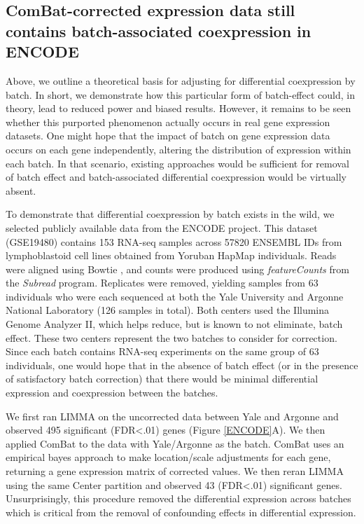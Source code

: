 \subsection{ComBat-corrected expression data still contains batch-associated
coexpression in ENCODE}

Above, we outline a theoretical basis for adjusting for differential
coexpression by batch. In short, we demonstrate how this particular
form of batch-effect could, in theory, lead to reduced power and biased
results. However, it remains to be seen whether this purported phenomenon
actually occurs in real gene expression datasets. One might hope that
the impact of batch on gene expression data occurs on each gene independently,
altering the distribution of expression within each batch. In that
scenario, existing approaches would be sufficient for removal of batch
effect and batch-associated differential coexpression would be virtually
absent. 

To demonstrate that differential coexpression by batch exists in the
wild, we selected publicly available data from the ENCODE project.
This dataset (GSE19480) contains 153 RNA-seq samples across 57820
ENSEMBL IDs from lymphoblastoid cell lines obtained from Yoruban HapMap
individuals. Reads were aligned using Bowtie \cite{langmead2009ultrafast},
and counts were produced using \emph{featureCounts }from the \emph{Subread}
program\cite{liao2014featurecounts}. Replicates were removed, yielding
samples from 63 individuals who were each sequenced at both the Yale
University and Argonne National Laboratory (126 samples in total).
Both centers used the Illumina Genome Analyzer II, which helps reduce,
but is known to not eliminate, batch effect. These two centers represent
the two batches to consider for correction. Since each batch contains
RNA-seq experiments on the same group of 63 individuals, one would
hope that in the absence of batch effect (or in the presence of satisfactory
batch correction) that there would be minimal differential expression
and coexpression between the batches.

We first ran LIMMA on the uncorrected data between Yale and Argonne
and observed 495 significant (FDR<.01) genes (Figure \ref{ENCODE}A).
We then applied ComBat to the data with Yale/Argonne as the batch.
ComBat uses an empirical bayes approach to make location/scale adjustments
for each gene, returning a gene expression matrix of corrected values.
We then reran LIMMA using the same Center partition and observed 43
(FDR<.01) significant genes. Unsurprisingly, this procedure removed
the differential expression across batches which is critical from
the removal of confounding effects in differential expression. 

